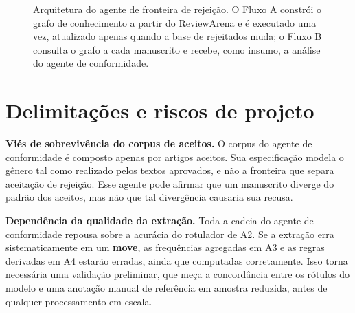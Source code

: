\begin{figure}[H]
\caption{Arquitetura do agente de fronteira de rejeição. O Fluxo A constrói o grafo de conhecimento a partir do ReviewArena e é executado uma vez, atualizado apenas quando a base de rejeitados muda; o Fluxo B consulta o grafo a cada manuscrito e recebe, como insumo, a análise do agente de conformidade.}
\label{fig:arquitetura-fronteira}
\end{figure}

\section{Delimitações e riscos de projeto}
\label{sec:limitacoes}

\textbf{Viés de sobrevivência do corpus de aceitos.} O corpus do agente de conformidade é composto apenas por artigos aceitos. Sua especificação modela o gênero tal como realizado pelos textos aprovados, e não a fronteira que separa aceitação de rejeição. Esse agente pode afirmar que um manuscrito diverge do padrão dos aceitos, mas não que tal divergência causaria sua recusa. 

\textbf{Dependência da qualidade da extração.} Toda a cadeia do agente de conformidade repousa sobre a acurácia do rotulador de A2. Se a extração erra sistematicamente em um \textbf{move}, as frequências agregadas em A3 e as regras derivadas em A4 estarão erradas, ainda que computadas corretamente. Isso torna necessária uma validação preliminar, que meça a concordância entre os rótulos do modelo e uma anotação manual de referência em amostra reduzida, antes de qualquer processamento em escala.

